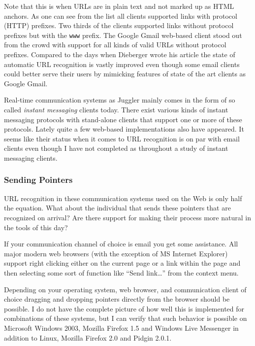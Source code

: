 \documentclass[12pt,a4paper]{article}
\begin{document}
Note that this is when URLs are in plain text and not marked up as
HTML anchors. As one can see from the list all clients supported links with
protocol (HTTP) prefixes. Two thirds of the clients supported links without
protocol prefixes but with the \texttt{www} prefix. The Google Gmail web-based
client stood out from the crowd with support for all kinds of valid URLs
without protocol prefixes. Compared to the days when Dieberger wrote his
article the state of automatic URL recognition is vastly improved even
though some email clients could better serve their users by
mimicking features of state of the art clients as Google Gmail. 

Real-time communication systems as Juggler mainly comes in the form of so
called \emph{instant messaging} clients today. There exist various kinds of
instant messaging protocols with stand-alone clients that support one or more
of these protocols. Lately quite a few web-based implementations
also have appeared. It seems like their status when it comes to URL
recognition is on par with email clients even though I have not completed as
throughout a study of instant messaging clients.


\subsubsection{Sending Pointers}

URL recognition in these communication systems used on the Web is only half
the equation. What about the individual that sends these pointers that are
recognized on arrival? Are there support for making their process more natural
in the tools of this day?

If your communication channel of choice is email you get some assistance. All
major modern web browsers (with the exception of MS Internet Explorer)
support right clicking either on the current page or
a link within the page and then selecting some sort of function like ``Send
link\ldots'' from the context menu.

Depending on your operating system, web browser, and communication
client of choice dragging and dropping pointers directly from the browser
should be possible. I do not have the complete picture of how well this is
implemented for combinations of these systems, but I can verify that such
behavior is possible on Microsoft Windows 2003, Mozilla Firefox 1.5 and
Windows Live Messenger in addition to Linux, Mozilla Firefox 2.0 and Pidgin
2.0.1.
\end{document}

